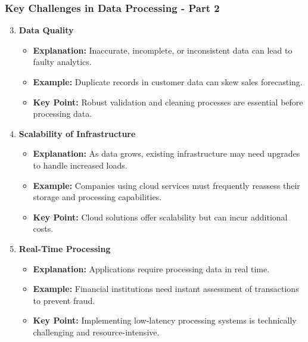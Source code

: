 \documentclass[aspectratio=169]{beamer}
\begin{document}
\begin{frame}[fragile]
    \frametitle{Key Challenges in Data Processing - Part 2}
    
    \begin{enumerate}
        \setcounter{enumi}{2} %
        \item \textbf{Data Quality}
            \begin{itemize}
                \item \textbf{Explanation:} Inaccurate, incomplete, or inconsistent data can lead to faulty analytics.
                \item \textbf{Example:} Duplicate records in customer data can skew sales forecasting.
                \item \textbf{Key Point:} Robust validation and cleaning processes are essential before processing data.
            \end{itemize}

        \item \textbf{Scalability of Infrastructure}
            \begin{itemize}
                \item \textbf{Explanation:} As data grows, existing infrastructure may need upgrades to handle increased loads.
                \item \textbf{Example:} Companies using cloud services must frequently reassess their storage and processing capabilities.
                \item \textbf{Key Point:} Cloud solutions offer scalability but can incur additional costs.
            \end{itemize}
        
        \item \textbf{Real-Time Processing}
            \begin{itemize}
                \item \textbf{Explanation:} Applications require processing data in real time.
                \item \textbf{Example:} Financial institutions need instant assessment of transactions to prevent fraud.
                \item \textbf{Key Point:} Implementing low-latency processing systems is technically challenging and resource-intensive.
            \end{itemize}
    \end{enumerate}
\end{frame}
\end{document}
